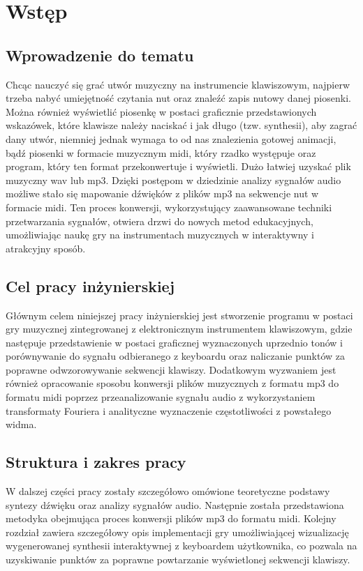 \chapter{Wstęp}
\vspace{-30pt}
\section{Wprowadzenie do tematu }
Chcąc nauczyć się grać utwór muzyczny na instrumencie klawiszowym, najpierw trzeba nabyć umiejętność czytania nut oraz znaleźć zapis nutowy danej piosenki. Można również wyświetlić piosenkę w postaci graficznie przedstawionych wskazówek, które klawisze należy naciskać i jak długo (tzw. synthesii), aby zagrać dany utwór, niemniej jednak wymaga to od nas znalezienia gotowej animacji, bądź piosenki w formacie muzycznym midi, który rzadko występuje oraz program, który ten format przekonwertuje i wyświetli. Dużo łatwiej uzyskać plik muzyczny wav lub mp3. Dzięki postępom w dziedzinie analizy sygnałów audio możliwe stało się mapowanie dźwięków z plików mp3 na sekwencje nut w formacie midi. Ten proces konwersji, wykorzystujący zaawansowane techniki przetwarzania sygnałów, otwiera drzwi do nowych metod edukacyjnych, umożliwiając naukę gry na instrumentach muzycznych w interaktywny i atrakcyjny sposób.
\section{Cel pracy inżynierskiej}
Głównym celem niniejszej pracy inżynierskiej jest stworzenie programu w postaci gry muzycznej zintegrowanej z elektronicznym instrumentem klawiszowym, gdzie następuje przedstawienie w postaci graficznej wyznaczonych uprzednio tonów i porównywanie do sygnału odbieranego z keyboardu oraz naliczanie punktów za poprawne odwzorowywanie sekwencji klawiszy.
Dodatkowym wyzwaniem jest również opracowanie sposobu konwersji plików muzycznych z formatu mp3 do formatu midi poprzez przeanalizowanie sygnału audio z wykorzystaniem transformaty Fouriera i analityczne wyznaczenie częstotliwości z powstałego widma.
\newpage
\section{Struktura i zakres pracy}
W dalszej części pracy zostały szczegółowo omówione teoretyczne podstawy syntezy dźwięku oraz analizy sygnałów audio. Następnie została przedstawiona metodyka obejmująca proces konwersji plików mp3 do formatu midi. Kolejny rozdział zawiera szczegółowy opis implementacji gry umożliwiającej wizualizację wygenerowanej synthesii interaktywnej z keyboardem użytkownika, co pozwala na uzyskiwanie punktów za poprawne powtarzanie wyświetlonej sekwencji klawiszy.

